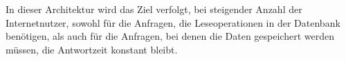 In dieser Architektur wird das Ziel verfolgt, bei steigender Anzahl der Internetnutzer, sowohl für die Anfragen, die Leseoperationen in der Datenbank benötigen, als auch für die Anfragen, bei denen die Daten gespeichert werden müssen, die Antwortzeit konstant bleibt.
%
%
%
%
%
%
%
%
%


